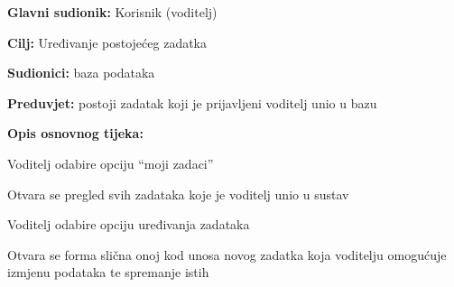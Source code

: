 					\noindent {}
					\begin{packed_item}
						
						\item \textbf{Glavni sudionik: }Korisnik (voditelj)
						\item \textbf{Cilj:} Uređivanje postojećeg zadatka
						\item \textbf{Sudionici:} baza podataka
						\item \textbf{Preduvjet:} postoji zadatak koji je prijavljeni voditelj unio u bazu
						\item \textbf{Opis osnovnog tijeka:}
						
						\item[] \begin{packed_enum}
							\item Voditelj odabire opciju “moji zadaci”
							\item Otvara se pregled svih zadataka koje je voditelj unio u sustav
							\item Voditelj odabire opciju uređivanja zadataka
							\item Otvara se forma slična onoj kod unosa novog zadatka koja voditelju omogućuje izmjenu podataka te spremanje istih
						\end{packed_enum}
					\end{packed_item}
					
					
					
